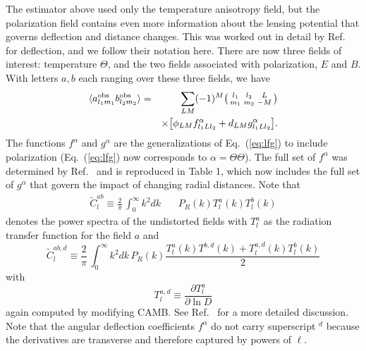 \documentclass[prd,amsmath,amssymb,floatfix,superscriptaddress,nofootinbib,twocolumn]{revtex4-1}
\def\be{\begin{equation}}
\def\ee{\end{equation}}
\def\bea{\begin{eqnarray}}
\def\eea{\end{eqnarray}}
\newcommand{\ec}[1]{Eq.~(\ref{eq:#1})}
\begin{document}
The estimator above used only the temperature anisotropy field, but the polarization field contains even more information about the lensing potential that governs deflection and distance changes. This was worked out in detail by Ref.~\cite{Okamoto:2003zw} for deflection, and we follow their notation here. There are now three fields of interest: temperature $\Theta$, and the two fields associated with polarization, $E$ and $B$. With letters $a,b$ each ranging over these three fields, we have 
\bea
\langle a^{\rm obs}_{l_{1}m_{1}}b^{\rm obs}_{l_{2}m_{2}}\rangle &=& \sum_{LM}(-1)^{M}\bigl(\begin{smallmatrix} l_1 & l_2 & L \\ m_1 & m_2 & -M  \end{smallmatrix}\bigr)\nonumber \\
&&\times
\big[ \phi_{LM}f^{\alpha}_{l_{1}Ll_{2}} + d_{LM}g^{\alpha}_{l_{1}Ll_{2}} \big] 
.\eea
The functions $f^\alpha$ and $g^\alpha$ are the generalizations of \ec{lfg} to include polarization (\ec{lfg} now corresponds to $\alpha=\Theta\Theta$). The full set of $f^{\alpha}$ was determined by Ref.~\cite{Okamoto:2003zw} and is reproduced in Table 1, which now includes the full set of $g^{\alpha}$ that govern the impact of changing radial distances. Note
that
\bea
\tilde{C}^{ab}_{l} \equiv \frac{2}{\pi}\,\int_0^\infty k^{2}dk \,&&{P}_{R}(k) T^{a}_l(k) T^b_l(k) \eea
denotes the power spectra of the undistorted fields with $T_l^a$ as the radiation transfer
function for the field $a$ and 
\be
\tilde{C}^{ab,d}_{l} \equiv  \frac{2}{\pi}\,\int_0^\infty k^{2}dk \,{P}_{R}(k)\frac{T_l^{a}(k)T^{b,d}(k)+T_l^{a,d}(k)T_l^{b}(k)}{2} 
\ee
with 
\begin{equation}
T_l^{a,d} \equiv \frac{\partial T_l^a}{\partial \ln D}
\end{equation}
again computed by modifying CAMB.  
 See Ref.~\cite{Hu:1997de} for a more detailed discussion.
Note that the angular deflection coefficients $f^\alpha$ do not carry superscript $^d$ because the derivatives are transverse and therefore captured by powers of $\ell$. 
\end{document}
